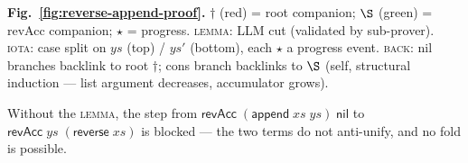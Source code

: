 {\footnotesize
\textbf{Fig.~\ref{fig:reverse-append-proof}.}
$\dagger$ (red) = root companion; $\S$ (green) = revAcc companion; $\star$ = progress.
\textsc{lemma}: LLM cut (validated by sub-prover).
\textsc{iota}: case split on $ys$ (top) / $ys'$ (bottom), each $\star$ a progress event.
\textsc{back}: nil branches backlink to root $\dagger$; cons branch backlinks to $\S$
(self, structural induction — list argument decreases, accumulator grows).
}

\medskip

Without the \textsc{lemma}, the step from
$\mathsf{revAcc}\;(\mathsf{append}\;xs\;ys)\;\mathsf{nil}$
to $\mathsf{revAcc}\;ys\;(\mathsf{reverse}\;xs)$ is blocked ---
the two terms do not anti-unify, and no fold is possible.

